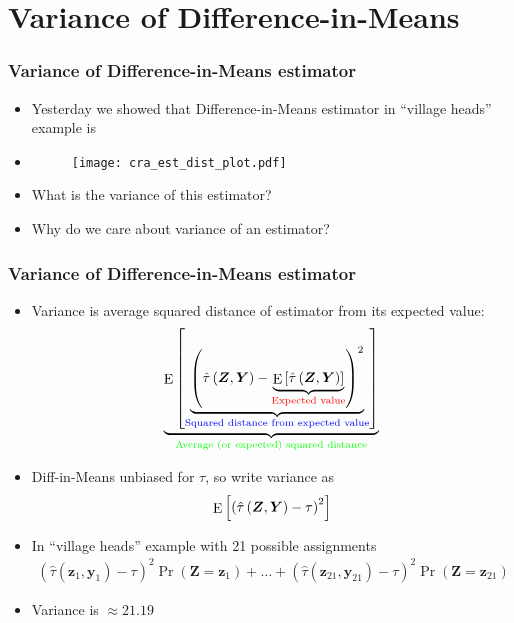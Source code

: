 \documentclass[table, xcolor = {dvipsnames}, 9pt]{beamer}
\theoremstyle{plain}
\DeclareMathOperator{\E}{\rm{E}}
\begin{document}
\section{Variance of Difference-in-Means}
\begin{frame}
\frametitle{Variance of Difference-in-Means estimator} 
\begin{itemize}
\item Yesterday we showed that Difference-in-Means estimator in ``village heads'' example is 
\item[]
\begin{figure}[H]
\texttt{[image: cra\_est\_dist\_plot.pdf]}
\end{figure} 
\item What is the variance of this estimator?  
\item Why do we care about variance of an estimator?
\end{itemize}
\end{frame}
\begin{frame}
\frametitle{Variance of Difference-in-Means estimator} 
\begin{itemize}
\item Variance is average squared distance of estimator from its expected value:  
\begin{equation*}
\underbrace{\E\left[\underbrace{\left(\hat{\tau}\left(\bm{Z}, \bm{Y}\right) - \underbrace{\E\left[\hat{\tau}\left(\bm{Z}, \bm{Y}\right)\right]}_{\color{red}{\text{Expected value}}}\right)^2}_{\color{blue}{\text{Squared distance from expected value}}}\right]}_{\color{green}{\text{Average (or expected) squared distance}}}
\end{equation*} \pause
\item Diff-in-Means unbiased for $\tau$, so write variance as 
\begin{equation*}
\E\left[\left(\hat{\tau}\left(\bm{Z}, \bm{Y}\right) - \tau\right)^2\right]
\end{equation*} \pause
\item In ``village heads'' example with 21 possible assignments
\begin{align*}
\left(\hat{\tau}\left(\bm{z}_1, \bm{y}_1\right) - \tau\right)^2 \Pr\left(\bm{Z} = \bm{z}_1\right) + \ldots + \left(\hat{\tau}\left(\bm{z}_{21}, \bm{y}_{21}\right) - \tau\right)^2 \Pr\left(\bm{Z} = \bm{z}_{21}\right)
\end{align*}  
\item[] Variance is $\approx 21.19$
\end{itemize}
\end{frame}
\end{document}
